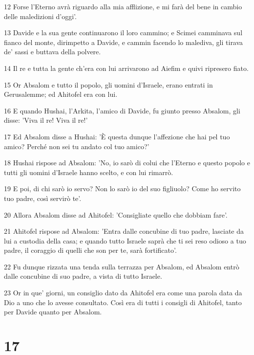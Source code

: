 \par 12 Forse l'Eterno avrà riguardo alla mia afflizione, e mi farà del bene in cambio delle maledizioni d'oggi'.
\par 13 Davide e la sua gente continuarono il loro cammino; e Scimei camminava sul fianco del monte, dirimpetto a Davide, e cammin facendo lo malediva, gli tirava de' sassi e buttava della polvere.
\par 14 Il re e tutta la gente ch'era con lui arrivarono ad Aiefim e quivi ripresero fiato.
\par 15 Or Absalom e tutto il popolo, gli uomini d'Israele, erano entrati in Gerusalemme; ed Ahitofel era con lui.
\par 16 E quando Hushai, l'Arkita, l'amico di Davide, fu giunto presso Absalom, gli disse: 'Viva il re! Viva il re!'
\par 17 Ed Absalom disse a Hushai: 'È questa dunque l'affezione che hai pel tuo amico? Perché non sei tu andato col tuo amico?'
\par 18 Hushai rispose ad Absalom: 'No, io sarò di colui che l'Eterno e questo popolo e tutti gli uomini d'Israele hanno scelto, e con lui rimarrò.
\par 19 E poi, di chi sarò io servo? Non lo sarò io del suo figliuolo? Come ho servito tuo padre, così servirò te'.
\par 20 Allora Absalom disse ad Ahitofel: 'Consigliate quello che dobbiam fare'.
\par 21 Ahitofel rispose ad Absalom: 'Entra dalle concubine di tuo padre, lasciate da lui a custodia della casa; e quando tutto Israele saprà che ti sei reso odioso a tuo padre, il coraggio di quelli che son per te, sarà fortificato'.
\par 22 Fu dunque rizzata una tenda sulla terrazza per Absalom, ed Absalom entrò dalle concubine di suo padre, a vista di tutto Israele.
\par 23 Or in que' giorni, un consiglio dato da Ahitofel era come una parola data da Dio a uno che lo avesse consultato. Così era di tutti i consigli di Ahitofel, tanto per Davide quanto per Absalom.

\chapter{17}

